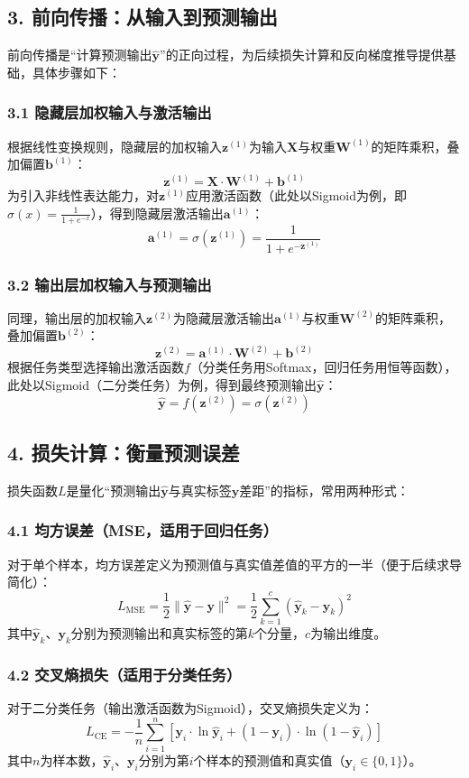 \documentclass[12pt,a4paper]{article}
\newcommand{\Wone}{\mathbf{W}^{(1)}}    %
\newcommand{\Wtwo}{\mathbf{W}^{(2)}}    %
\newcommand{\bone}{\mathbf{b}^{(1)}}    %
\newcommand{\btwo}{\mathbf{b}^{(2)}}    %
\newcommand{\zone}{\mathbf{z}^{(1)}}    %
\newcommand{\ztwo}{\mathbf{z}^{(2)}}    %
\newcommand{\aone}{\mathbf{a}^{(1)}}    %
\newcommand{\yhat}{\hat{\mathbf{y}}}    %
\newcommand{\ytrue}{\mathbf{y}}         %
\newcommand{\Xinput}{\mathbf{X}}        %
\newcommand{\Loss}{L}                   %
\newcommand{\sigmoid}{\sigma}           %
\begin{document}
\subsection{3. 前向传播：从输入到预测输出}
前向传播是“计算预测输出\(\yhat\)”的正向过程，为后续损失计算和反向梯度推导提供基础，具体步骤如下：

\subsubsection{3.1 隐藏层加权输入与激活输出}
根据线性变换规则，隐藏层的加权输入\(\zone\)为输入\(\Xinput\)与权重\(\Wone\)的矩阵乘积，叠加偏置\(\bone\)：
\[
\zone = \Xinput \cdot \Wone + \bone
\]
为引入非线性表达能力，对\(\zone\)应用激活函数（此处以Sigmoid为例，即\(\sigmoid(x) = \frac{1}{1+e^{-x}}\)），得到隐藏层激活输出\(\aone\)：
\[
\aone = \sigmoid(\zone) = \frac{1}{1 + e^{-\zone}}
\]

\subsubsection{3.2 输出层加权输入与预测输出}
同理，输出层的加权输入\(\ztwo\)为隐藏层激活输出\(\aone\)与权重\(\Wtwo\)的矩阵乘积，叠加偏置\(\btwo\)：
\[
\ztwo = \aone \cdot \Wtwo + \btwo
\]
根据任务类型选择输出激活函数\(f\)（分类任务用Softmax，回归任务用恒等函数），此处以Sigmoid（二分类任务）为例，得到最终预测输出\(\yhat\)：
\[
\yhat = f(\ztwo) = \sigmoid(\ztwo)
\]


\subsection{4. 损失计算：衡量预测误差}
损失函数\(\Loss\)是量化“预测输出\(\yhat\)与真实标签\(\ytrue\)差距”的指标，常用两种形式：

\subsubsection{4.1 均方误差（MSE，适用于回归任务）}
对于单个样本，均方误差定义为预测值与真实值差值的平方的一半（便于后续求导简化）：
\[
\Loss_{\text{MSE}} = \frac{1}{2} \|\yhat - \ytrue\|^2 = \frac{1}{2} \sum_{k=1}^c (\yhat_k - \ytrue_k)^2
\]
其中\(\yhat_k\)、\(\ytrue_k\)分别为预测输出和真实标签的第\(k\)个分量，\(c\)为输出维度。

\subsubsection{4.2 交叉熵损失（适用于分类任务）}
对于二分类任务（输出激活函数为Sigmoid），交叉熵损失定义为：
\[
\Loss_{\text{CE}} = -\frac{1}{n} \sum_{i=1}^n \left[ \ytrue_i \cdot \ln\yhat_i + (1-\ytrue_i) \cdot \ln(1-\yhat_i) \right]
\]
其中\(n\)为样本数，\(\yhat_i\)、\(\ytrue_i\)分别为第\(i\)个样本的预测值和真实值（\(\ytrue_i \in \{0,1\}\)）。
\end{document}
